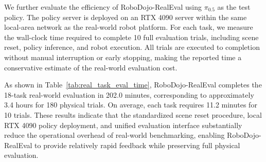 We further evaluate the efficiency of RoboDojo-RealEval using $\pi_{0.5}$ as the test policy. The policy server is deployed on an RTX 4090 server within the same local-area network as the real-world robot platform. For each task, we measure the wall-clock time required to complete 10 full evaluation trials, including scene reset, policy inference, and robot execution. All trials are executed to completion without manual interruption or early stopping, making the reported time a conservative estimate of the real-world evaluation cost.

As shown in Table~\ref{tab:real_task_eval_time}, RoboDojo-RealEval completes the 18-task real-world evaluation in 202.0 minutes, corresponding to approximately 3.4 hours for 180 physical trials. On average, each task requires 11.2 minutes for 10 trials. These results indicate that the standardized scene reset procedure, local RTX 4090 policy deployment, and unified evaluation interface substantially reduce the operational overhead of real-world benchmarking, enabling RoboDojo-RealEval to provide relatively rapid feedback while preserving full physical evaluation.

\begin{table}[h]
\centering
\caption{\textbf{Real-world evaluation time for each task.}
Each entry reports the wall-clock time required to complete 10 full evaluation trials, including scene reset, RTX 4090 policy inference within the same local-area network, and robot execution.}
\label{tab:real_task_eval_time}
\end{table}
